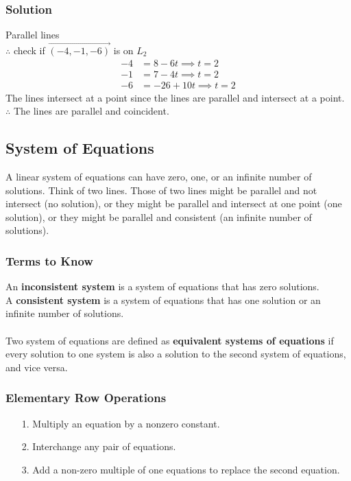 \documentclass{article}
\begin{document}
\subsubsection*{Solution}
Parallel lines \\
\(\therefore\) check if \(\overrightarrow{(-4,-1,-6)}\) is on \( L_2 \)
\begin{align*}
    -4 &= 8 - 6t \implies t = 2 \\
    -1 &= 7 - 4t \implies t = 2 \\
    -6 &= -26 + 10t \implies t = 2
\end{align*}
The lines intersect at a point since the lines are parallel and intersect at a point. \(\therefore\) The lines are parallel and coincident.

\subsection{System of Equations}
A linear system of equations can have zero, one, or an infinite number of solutions. Think of two lines. Those of two lines might be parallel and not intersect (no solution), or they might be parallel and intersect at one point (one solution), or they might be parallel and consistent (an infinite number of solutions).
\subsubsection{Terms to Know}
An \textbf{inconsistent system} is a system of equations that has zero solutions.\\
A \textbf{consistent system} is a system of equations that has one solution or an infinite number of solutions.\\\\
Two system of equations are defined as \textbf{equivalent systems of equations} if every solution to one system is also a solution to the second system of equations, and vice versa.

\subsubsection{Elementary Row Operations }
\begin{enumerate}
    \item[1.] Multiply an equation by a nonzero constant.
    \item[2.] Interchange any pair of equations. 
    \item[3.] Add a non-zero multiple of one equations to replace the second equation.
\end{enumerate}
\end{document}
